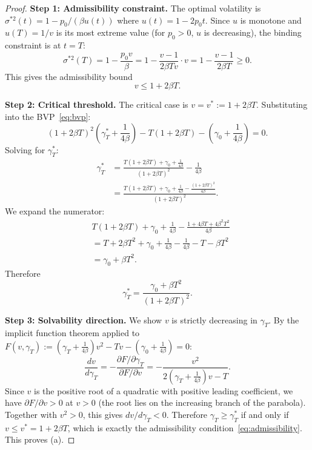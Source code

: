 \documentclass[12pt]{article}
\theoremstyle{definition}
\begin{document}
\begin{proof}
\textbf{Step 1: Admissibility constraint.}
The optimal volatility is $\sigma^{*2}(t) = 1 - p_0/(\beta u(t))$
where $u(t) = 1 - 2p_0 t$.
Since $u$ is monotone and $u(T) = 1/v$ is its most extreme value
(for $p_0 > 0$, $u$ is decreasing), the binding constraint is at $t = T$:
\[
\sigma^{*2}(T) = 1 - \frac{p_0 v}{\beta} = 1 - \frac{v - 1}{2\beta T v}
  \cdot v = 1 - \frac{v - 1}{2\beta T} \ge 0.
\]
This gives the admissibility bound
\begin{equation}\label{eq:admissibility}
v \le 1 + 2\beta T.
\end{equation}

\medskip\noindent
\textbf{Step 2: Critical threshold.}
The critical case is $v = v^* := 1 + 2\beta T$.
Substituting into the BVP~\eqref{eq:bvp}:
\[
(1 + 2\beta T)^2 \!\left(\gamma_T^* + \frac{1}{4\beta}\right)
  - T(1 + 2\beta T) - \left(\gamma_0 + \frac{1}{4\beta}\right) = 0.
\]
Solving for $\gamma_T^*$:
\begin{align*}
\gamma_T^* &= \frac{T(1 + 2\beta T) + \gamma_0 + \frac{1}{4\beta}}
  {(1 + 2\beta T)^2} - \frac{1}{4\beta} \\
  &= \frac{T(1 + 2\beta T) + \gamma_0 + \frac{1}{4\beta}
    - \frac{(1 + 2\beta T)^2}{4\beta}}{(1 + 2\beta T)^2}.
\end{align*}
We expand the numerator:
\begin{align*}
&T(1 + 2\beta T) + \gamma_0 + \frac{1}{4\beta}
  - \frac{1 + 4\beta T + 4\beta^2 T^2}{4\beta} \\
&= T + 2\beta T^2 + \gamma_0 + \frac{1}{4\beta}
  - \frac{1}{4\beta} - T - \beta T^2 \\
&= \gamma_0 + \beta T^2.
\end{align*}
Therefore
\[
\gamma_T^* = \frac{\gamma_0 + \beta T^2}{(1 + 2\beta T)^2}.
\]

\medskip\noindent
\textbf{Step 3: Solvability direction.}
We show $v$ is strictly decreasing in $\gamma_T$.
By the implicit function theorem applied to
$F(v, \gamma_T) := (\gamma_T + \tfrac{1}{4\beta})v^2 - Tv
- (\gamma_0 + \tfrac{1}{4\beta}) = 0$:
\[
\frac{dv}{d\gamma_T} = -\frac{\partial F/\partial \gamma_T}
{\partial F/\partial v}
= -\frac{v^2}{2(\gamma_T + \tfrac{1}{4\beta})v - T}.
\]
Since $v$ is the positive root of a quadratic with positive leading
coefficient, we have $\partial F/\partial v > 0$ at $v > 0$
(the root lies on the increasing branch of the parabola).
Together with $v^2 > 0$, this gives $dv/d\gamma_T < 0$.
Therefore $\gamma_T \ge \gamma_T^*$ if and only if $v \le v^* = 1 + 2\beta T$,
which is exactly the admissibility condition~\eqref{eq:admissibility}.
This proves (a).


\end{proof}
\end{document}
